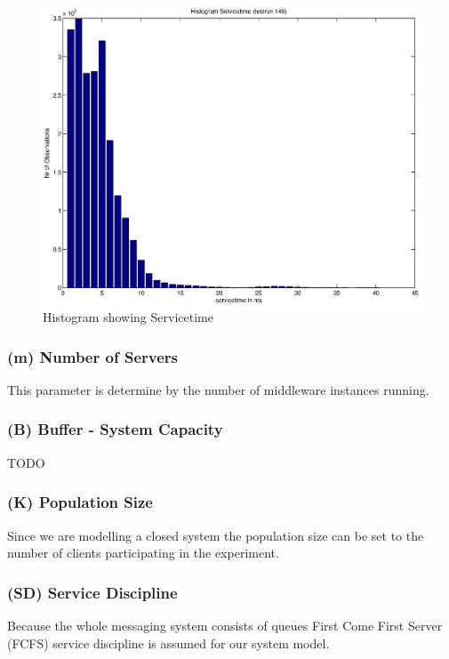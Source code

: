 \documentclass[a4paper]{article}
\begin{document}
\begin{figure}[H]
	\begin{center}
    \includegraphics[scale=0.6]{../plots-ms2-mg/servicetime.eps}
  \end{center}
  \caption{Histogram showing Servicetime}
  \label{fig:servicetime}
\end{figure}



\subsubsection{(m) Number of Servers}

This parameter is determine by the number of middleware instances running.

\subsubsection{(B) Buffer - System Capacity }

TODO

\subsubsection{(K) Population Size}

Since we are modelling a closed system the population size can be set to the number of clients participating in the experiment.

\subsubsection{(SD) Service Discipline}
Because the whole messaging system consists of queues  First Come First Server (FCFS) service discipline is assumed for our system model.
\end{document}
